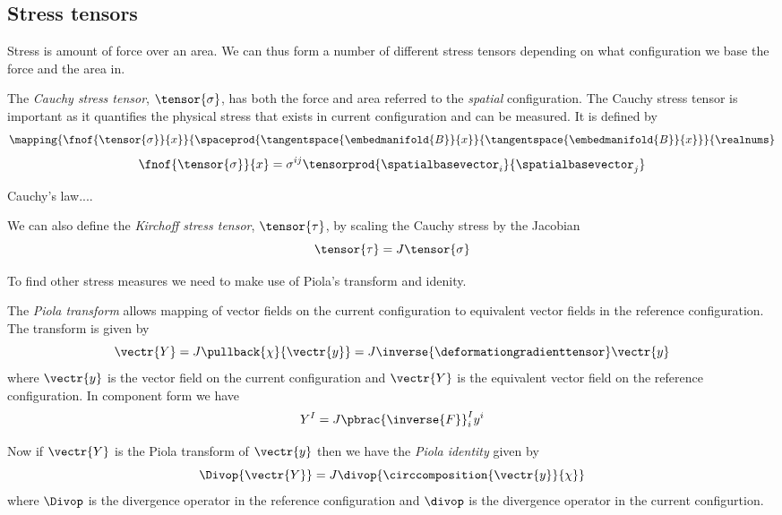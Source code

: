 \subsection{Stress tensors}

Stress is amount of force over an area. We can thus form a number of different
stress tensors depending on what configuration we base the force and the area
in.

The \emph{Cauchy stress tensor}, $\tensor{\sigma}$, has both the force and
area referred to the \emph{spatial} configuration. The Cauchy stress tensor is
important as it quantifies the physical stress that exists in current
configuration and can be measured. It is defined by
\begin{equation}
  \mapping{\fnof{\tensor{\sigma}}{x}}{\spaceprod{\tangentspace{\embedmanifold{B}}{x}}{\tangentspace{\embedmanifold{B}}{x}}}{\realnums}
\end{equation}
\ie
\begin{equation}
  \fnof{\tensor{\sigma}}{x}=\sigma^{ij}\tensorprod{\spatialbasevector_{i}}{\spatialbasevector_{j}}
\end{equation}

Cauchy's law....

We can also define the \emph{Kirchoff stress tensor}, $\tensor{\tau}$, by
scaling the Cauchy stress by the Jacobian \ie
\begin{equation}
  \tensor{\tau}=J\tensor{\sigma}
\end{equation}

To find other stress measures we need to make use of Piola's transform and
idenity.

The \emph{Piola transform} allows mapping of vector fields on the current
configuration to equivalent vector fields in the reference configuration. The
transform is given by
\begin{equation}
  \vectr{Y}=J\pullback{\chi}{\vectr{y}}=J\inverse{\deformationgradienttensor}\vectr{y}
\end{equation}
where $\vectr{y}$ is the vector field on the current configuration and
$\vectr{Y}$ is the equivalent vector field on the reference configuration. In
component form we have
\begin{equation}
  Y^{I}=J\pbrac{\inverse{F}}^{I}_{i}y^{i}
\end{equation}

Now if $\vectr{Y}$ is the Piola transform of $\vectr{y}$ then we have the
\emph{Piola identity} given by
\begin{equation}
  \Divop{\vectr{Y}}=J\divop{\circcomposition{\vectr{y}}{\chi}}
\end{equation}
where $\Divop$ is the divergence operator in the reference configuration and
$\divop$ is the divergence operator in the current configurtion. 

